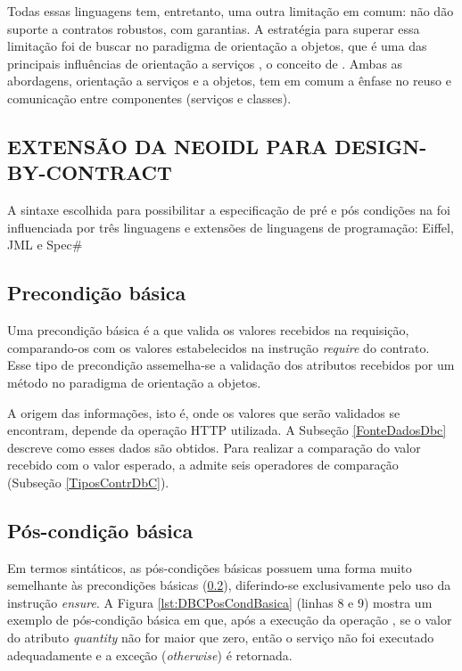Todas essas linguagens tem, entretanto, uma outra limitação em comum: não dão
suporte a contratos robustos, com garantias. A estratégia para superar essa
limitação foi de buscar no paradigma de orientação a objetos, que é uma das
principais influências de orientação a serviços \cite{erl2009web},
o conceito de \designbycontract{}. Ambas as abordagens, orientação a serviços e
a objetos, tem em comum a ênfase no reuso e comunicação entre componentes
(serviços e classes).

\subsection{EXTENSÃO DA NEOIDL PARA DESIGN-BY-CONTRACT}
\label{extensaoNeoIDL-DbC}

A sintaxe escolhida para possibilitar a especificação de pré e pós condições
na \neoidl{} foi influenciada por três linguagens e extensões de linguagens de
programação: Eiffel, JML e Spec\# 

\subsection{Precondição básica}
\label{precondicaoBasica}

Uma precondição básica é a que valida os valores recebidos na
requisição, comparando-os com os valores estabelecidos na instrução
\emph{require} do contrato. Esse tipo de precondição assemelha-se a validação
dos atributos recebidos por um método no paradigma de orientação a objetos.

A origem das informações, isto é, onde os valores que serão validados se
encontram, depende da operação HTTP utilizada. A Subseção \ref{FonteDadosDbc} descreve como esses
dados são obtidos. Para realizar a comparação do valor recebido com o valor
esperado, a \neoidl{} admite seis operadores de comparação (Subseção
\ref{TiposContrDbC}).

\subsection{Pós-condição básica}

Em termos sintáticos, as pós-condições básicas possuem uma forma muito
semelhante às precondições básicas (\ref{precondicaoBasica}), diferindo-se
exclusivamente pelo uso da instrução \emph{ensure}. A Figura
\ref{lst:DBCPosCondBasica} (linhas 8 e 9) mostra um exemplo de pós-condição
básica em que, após a execução da operação , se o valor do atributo
\emph{quantity} não for maior que zero, então o serviço não foi executado adequadamente e a exceção
(\emph{otherwise}) é retornada.

